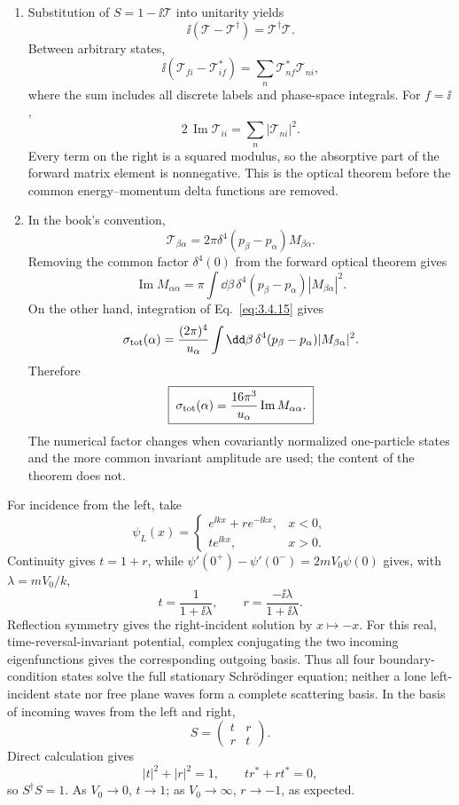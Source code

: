 \begin{enumerate}
\begin{enumerate}
\item
Substitution of \(S=1-\ii\mathcal T\) into unitarity yields
\[
 \ii(\mathcal T-\mathcal T^\dagger)=\mathcal T^\dagger\mathcal T.
\]
Between arbitrary states,
\[
 \ii(\mathcal T_{fi}-\mathcal T_{if}^*)
 =\sum_n\mathcal T_{nf}^*\mathcal T_{ni},
\]
where the sum includes all discrete labels and phase-space integrals.
For \(f=\ii\),
\[
 2\,\operatorname{Im}\mathcal T_{ii}
 =\sum_n|\mathcal T_{ni}|^2.
\]
Every term on the right is a squared modulus, so the absorptive part of
the forward matrix element is nonnegative.  This is the optical theorem
before the common energy--momentum delta functions are removed.
\item
In the book's convention,
\[
 \mathcal T_{\beta\alpha}
 =2\pi\delta^4(p_\beta-p_\alpha)M_{\beta\alpha}.
\]
Removing the common factor
\(\delta^4(0)\) from the forward optical theorem gives
\[
 \operatorname{Im}M_{\alpha\alpha}
 =\pi\int \dd\beta\,
 \delta^4(p_\beta-p_\alpha)|M_{\beta\alpha}|^2.
\]
On the other hand, integration of Eq.~\eqref{eq:3.4.15} gives
\[
 \sigma_{\rm tot}(\alpha)
 =\frac{(2\pi)^4}{u_\alpha}
 \int \dd\beta\,\delta^4(p_\beta-p_\alpha)
 |M_{\beta\alpha}|^2.
\]
Therefore
\[
 \boxed{\;
 \sigma_{\rm tot}(\alpha)
 =\frac{16\pi^3}{u_\alpha}
 \operatorname{Im}M_{\alpha\alpha}.
 \;}
\]
The numerical factor changes when covariantly normalized one-particle
states and the more common invariant amplitude are used; the content of
the theorem does not.
\end{enumerate}

For incidence from the left, take
\[
 \psi_L(x)=
 \begin{cases}
 e^{\ii kx}+r e^{-\ii kx},&x<0,\\
 t e^{\ii kx},&x>0.
 \end{cases}
\]
Continuity gives \(t=1+r\), while
\(\psi'(0^+)-\psi'(0^-)=2mV_0\psi(0)\) gives, with
\(\lambda=mV_0/k\),
\[
 t=\frac1{1+\ii\lambda},\qquad
 r=\frac{-\ii\lambda}{1+\ii\lambda}.
\]
Reflection symmetry gives the right-incident solution by \(x\mapsto-x\).
For this real, time-reversal-invariant potential, complex conjugating the
two incoming eigenfunctions gives the corresponding outgoing basis.
Thus all four boundary-condition states solve the full stationary
Schr\"odinger equation; neither a lone left-incident state nor free plane
waves form a complete scattering basis.
In the basis of incoming waves from the left and right,
\[
 S=\begin{pmatrix}t&r\\ r&t\end{pmatrix}.
\]
Direct calculation gives
\[
 |t|^2+|r|^2=1,\qquad tr^*+rt^*=0,
\]
so \(S^\dagger S=1\).  As \(V_0\to0\), \(t\to1\); as
\(V_0\to\infty\), \(r\to-1\), as expected.


\end{enumerate}
